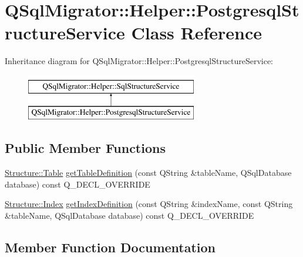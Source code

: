\hypertarget{class_q_sql_migrator_1_1_helper_1_1_postgresql_structure_service}{}\section{Q\+Sql\+Migrator\+:\+:Helper\+:\+:Postgresql\+Structure\+Service Class Reference}
\label{class_q_sql_migrator_1_1_helper_1_1_postgresql_structure_service}
Inheritance diagram for Q\+Sql\+Migrator\+:\+:Helper\+:\+:Postgresql\+Structure\+Service\+:\begin{figure}[H]
\begin{center}
\leavevmode
\includegraphics[height=2.000000cm]{class_q_sql_migrator_1_1_helper_1_1_postgresql_structure_service}
\end{center}
\end{figure}
\subsection*{Public Member Functions}
\begin{DoxyCompactItemize}
\item 
\hyperlink{class_q_sql_migrator_1_1_structure_1_1_table}{Structure\+::\+Table} \hyperlink{class_q_sql_migrator_1_1_helper_1_1_postgresql_structure_service_a6a6f23dd54be7f27f0fa798c65512746}{get\+Table\+Definition} (const Q\+String \&table\+Name, Q\+Sql\+Database database) const Q\+\_\+\+D\+E\+C\+L\+\_\+\+O\+V\+E\+R\+R\+I\+DE
\item 
\hyperlink{class_q_sql_migrator_1_1_structure_1_1_index}{Structure\+::\+Index} \hyperlink{class_q_sql_migrator_1_1_helper_1_1_postgresql_structure_service_ae2e7c6b4e341b0613817fe62c6de4b2d}{get\+Index\+Definition} (const Q\+String \&index\+Name, const Q\+String \&table\+Name, Q\+Sql\+Database database) const Q\+\_\+\+D\+E\+C\+L\+\_\+\+O\+V\+E\+R\+R\+I\+DE
\end{DoxyCompactItemize}


\subsection{Member Function Documentation}
\mbox{\label{class_q_sql_migrator_1_1_helper_1_1_postgresql_structure_service_ae2e7c6b4e341b0613817fe62c6de4b2d}} 
